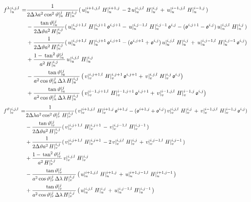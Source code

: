 \documentclass[a4paper]{article}
\begin{document}
\begin{equation}
  \begin{split}
    \,{f^\lambda}\vert_{u}^{{i},{j},{l}}\, =&
    \frac1{2\Delta\lambda a^2\,{\cos^2\vartheta}\vert_{u}^{{j}}\,\,{H}\vert_{u}^{{i},{j}}\,}(\,{u}\vert_{u}^{{i+1},{j},{l}}\,\,{H}\vert_{u}^{{i+1},{j}}\,-2\,{u}\vert_{u}^{{i},{j},{l}}\,\,{H}\vert_{u}^{{i},{j}}\,+\,{u}\vert_{u}^{{i-1},{j},{l}}\,\,{H}\vert_{u}^{{i-1},{j}}\,)\\
    &-\frac{\,{\tan\vartheta}\vert_{u}^{{j}}\,}{2\Delta\vartheta a^2\,{H}\vert_{u}^{{i},{j}}\,}(\,{u}\vert_{u}^{{i},{j+1},{l}}\,\,{H}\vert_{u}^{{i},{j+1}}\,\mathfrak{o}^{i,j+1}-\,{u}\vert_{u}^{{i},{j-1},{l}}\,\,{H}\vert_{u}^{{i},{j-1}}\,\mathfrak{o}^{i,j}-(\mathfrak{o}^{i,j+1}-\mathfrak{o}^{i,j})\,{u}\vert_{u}^{{i},{j},{l}}\,\,{H}\vert_{u}^{{i},{j}}\,)\\
    &+\frac1{2\Delta\vartheta a^2\,{H}\vert_{u}^{{i},{j}}\,}(\,{u}\vert_{u}^{{i},{j+1},{l}}\,\,{H}\vert_{u}^{{i},{j+1}}\,\mathfrak{o}^{i,j+1}-(\mathfrak{o}^{i,j+1}+\mathfrak{o}^{i,j})\,{u}\vert_{u}^{{i},{j},{l}}\,\,{H}\vert_{u}^{{i},{j}}\,+\,{u}\vert_{u}^{{i},{j-1},{l}}\,\,{H}\vert_{u}^{{i},{j-1}}\,\mathfrak{o}^{i,j})\\
    &+\frac{1-\,{\tan^2\vartheta}\vert_{u}^{{j}}\,}{a^2\,{H}\vert_{u}^{{i},{j}}\,}\,{u}\vert_{u}^{{i},{j},{l}}\,\,{H}\vert_{u}^{{i},{j}}\,\\
    &-\frac{\,{\tan\vartheta}\vert_{u}^{{j}}\,}{a^2\,{\cos\vartheta}\vert_{u}^{{j}}\,\Delta\lambda\,{H}\vert_{u}^{{i},{j}}\,}\left(\,{v}\vert_{v}^{{i},{j+1},{l}}\,\,{H}\vert_{v}^{{i},{j+1}}\,\mathfrak{o}^{i,j+1}+\,{v}\vert_{v}^{{i},{j},{l}}\,\,{H}\vert_{v}^{{i},{j}}\,\mathfrak{o}^{i,j}\right)\\
    &+\frac{\,{\tan\vartheta}\vert_{u}^{{j}}\,}{a^2\,{\cos\vartheta}\vert_{u}^{{j}}\,\Delta\lambda\,{H}\vert_{u}^{{i},{j}}\,}\left(\,{v}\vert_{v}^{{i-1},{j+1},{l}}\,\,{H}\vert_{v}^{{i-1},{j+1}}\,\mathfrak{o}^{i,j+1}+\,{v}\vert_{v}^{{i-1},{j},{l}}\,\,{H}\vert_{v}^{{i-1},{j}}\,\mathfrak{o}^{i,j}\right)
  \end{split}
\end{equation}
\begin{equation}
  \begin{split}
    \,{f^\vartheta}\vert_{v}^{{i},{j},{l}}\, =&
    \frac1{2\Delta\lambda a^2\,{\cos^2\vartheta}\vert_{v}^{{j}}\,\,{H}\vert_{v}^{{i},{j}}\,}(\,{v}\vert_{v}^{{i+1},{j},{l}}\,\,{H}\vert_{v}^{{i+1},{j}}\,\mathfrak{o}^{i+1,j}-(\mathfrak{o}^{i+1,j}+\mathfrak{o}^{i,j})\,{v}\vert_{v}^{{i},{j},{l}}\,\,{H}\vert_{v}^{{i},{j}}\,+\,{v}\vert_{v}^{{i-1},{j},{l}}\,\,{H}\vert_{v}^{{i-1},{j}}\,\mathfrak{o}^{i,j})\\
    &-\frac{\,{\tan\vartheta}\vert_{v}^{{j}}\,}{2\Delta\vartheta a^2\,{H}\vert_{v}^{{i},{j}}\,}(\,{v}\vert_{v}^{{i},{j+1},{l}}\,\,{H}\vert_{v}^{{i},{j+1}}\,-\,{v}\vert_{v}^{{i},{j-1},{l}}\,\,{H}\vert_{v}^{{i},{j-1}}\,)\\
    &+\frac1{2\Delta\vartheta a^2\,{H}\vert_{v}^{{i},{j}}\,}(\,{v}\vert_{v}^{{i},{j+1},{l}}\,\,{H}\vert_{v}^{{i},{j+1}}\,-2\,{v}\vert_{v}^{{i},{j},{l}}\,\,{H}\vert_{v}^{{i},{j}}\,+\,{v}\vert_{v}^{{i},{j-1},{l}}\,\,{H}\vert_{v}^{{i},{j-1}}\,)\\
    &+\frac{1-\,{\tan^2\vartheta}\vert_{v}^{{j}}\,}{a^2\,{H}\vert_{v}^{{i},{j}}\,}\,{v}\vert_{v}^{{i},{j},{l}}\,\,{H}\vert_{v}^{{i},{j}}\,\\
    &-\frac{\,{\tan\vartheta}\vert_{v}^{{j}}\,}{a^2\,{\cos\vartheta}\vert_{v}^{{j}}\,\Delta\lambda\,{H}\vert_{v}^{{i},{j}}\,}\left(\,{u}\vert_{u}^{{i+1},{j},{l}}\,\,{H}\vert_{u}^{{i+1},{j}}\,+\,{u}\vert_{u}^{{i+1},{j-1},{l}}\,\,{H}\vert_{u}^{{i+1},{j-1}}\,\right)\\
    &+\frac{\,{\tan\vartheta}\vert_{v}^{{j}}\,}{a^2\,{\cos\vartheta}\vert_{v}^{{j}}\,\Delta\lambda\,{H}\vert_{v}^{{i},{j}}\,}\left(\,{u}\vert_{u}^{{i},{j},{l}}\,\,{H}\vert_{u}^{{i},{j}}\,+\,{u}\vert_{u}^{{i},{j-1},{l}}\,\,{H}\vert_{u}^{{i},{j-1}}\,\right)
  \end{split}
\end{equation}
\end{document}
